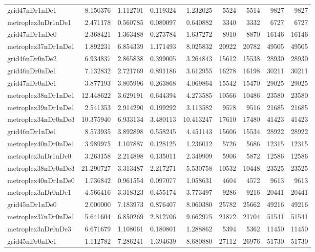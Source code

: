 \begin{longtable}{|l|r|r|r|r|r|r|r|r|}
grid47nDr1nDe1 & 8.150376 & 1.112701 & 0.119324 & 1.232025 & 5524 & 5514 & 9827 & 9827 \\
metroplex3nDr1nDe1 & 2.471178 & 0.560785 & 0.080097 & 0.640882 & 3340 & 3332 & 6727 & 6727 \\
grid47nDr1nDe0 & 2.368421 & 1.363488 & 0.273784 & 1.637272 & 8910 & 8870 & 16146 & 16146 \\
metroplex37nDr1nDe1 & 1.892231 & 6.854339 & 1.171493 & 8.025832 & 20922 & 20782 & 49505 & 49505 \\
grid46nDr0nDe2 & 6.934837 & 2.865838 & 0.399005 & 3.264843 & 15612 & 15538 & 28930 & 28930 \\
grid46nDr0nDe1 & 7.132832 & 2.721769 & 0.891186 & 3.612955 & 16278 & 16198 & 30211 & 30211 \\
grid47nDr0nDe1 & 3.877193 & 3.805996 & 0.263868 & 4.069864 & 15542 & 15470 & 29025 & 29025 \\
metroplex38nDr1nDe1 & 12.448622 & 3.629191 & 0.644394 & 4.273585 & 10566 & 10486 & 23580 & 23580 \\
metroplex39nDr1nDe1 & 2.541353 & 2.914290 & 0.199292 & 3.113582 & 9578 & 9516 & 21685 & 21685 \\
metroplex34nDr0nDe3 & 10.375940 & 6.933134 & 3.480113 & 10.413247 & 17610 & 17480 & 41423 & 41423 \\
grid46nDr1nDe1 & 8.573935 & 3.892898 & 0.558245 & 4.451143 & 15606 & 15534 & 28922 & 28922 \\
metroplex40nDr0nDe1 & 3.989975 & 1.107887 & 0.128125 & 1.236012 & 5726 & 5686 & 12315 & 12315 \\
metroplex3nDr1nDe0 & 3.263158 & 2.214898 & 0.135011 & 2.349909 & 5906 & 5872 & 12586 & 12586 \\
metroplex38nDr0nDe3 & 21.290727 & 3.313487 & 2.217271 & 5.530758 & 10532 & 10448 & 23525 & 23525 \\
metroplex40nDr1nDe0 & 1.736842 & 0.961554 & 0.097077 & 1.058631 & 4604 & 4572 & 9613 & 9613 \\
metroplex3nDr0nDe1 & 4.566416 & 3.318323 & 0.455174 & 3.773497 & 9286 & 9216 & 20441 & 20441 \\
grid45nDr1nDe0 & 2.000000 & 7.183973 & 0.876407 & 8.060380 & 25782 & 25662 & 49216 & 49216 \\
metroplex37nDr0nDe1 & 5.641604 & 6.850269 & 2.812706 & 9.662975 & 21872 & 21704 & 51541 & 51541 \\
metroplex3nDr0nDe3 & 6.671679 & 1.108061 & 0.180801 & 1.288862 & 5394 & 5362 & 11450 & 11450 \\
grid45nDr0nDe1 & 1.112782 & 7.286241 & 1.394639 & 8.680880 & 27112 & 26976 & 51730 & 51730 \\

\end{longtable}
